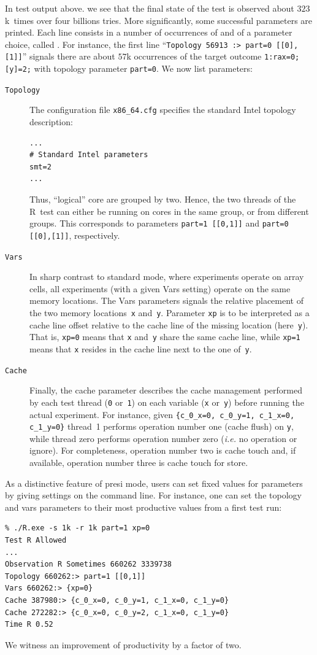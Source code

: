 In test output above. we see that the final state of the test is
observed about $323$k~times over four billions tries. More
significantly, some successful parameters are printed. Each line
consists in a number of occurrences of and of a parameter choice,
called . For instance,
the first line ``\texttt{Topology 56913 :> part=0 [[0],[1]]}'' signals
there are about $57$k occurrences of the target
outcome \texttt{1:rax=0; [y]=2;} with topology
parameter \texttt{part=0}. We now list parameters:
\begin{description}
\item[{\tt Topology}]  The configuration file \texttt{x86\_64.cfg}
specifies the standard Intel topology description:
\begin{verbatim}
...
# Standard Intel parameters
smt=2
...
\end{verbatim}
Thus, ``logical'' core are grouped by two. Hence, the two threads of
the R~test can either be running on cores in the same group, or from
different groups. This corresponds to parameters \texttt{part=1
[[0,1]]} and \texttt{part=0 [[0],[1]]}, respectively.
\item[{\tt Vars}] In sharp contrast to standard mode, where
experiments operate on array cells,  all experiments (with a given
Vars setting) operate on the same memory locations. The Vars
parameters signals the relative placement of the two memory
locations~\texttt{x} and~\texttt{y}. Parameter \texttt{xp} is to be
interpreted as a cache line offset relative to the cache line of the
missing location (here~\texttt{y}). That is, \texttt{xp=0} means
that \texttt{x} and~\texttt{y} share the same cache line,
while \texttt{xp=1} means that \texttt{x} resides in the cache line
next to the one of~\texttt{y}.
\item[{\tt Cache}] Finally, the cache  parameter describes the cache
management performed by each test thread (\texttt{0} or~\texttt{1}) on
each variable (\texttt{x} or~\texttt{y}) before running the actual
experiment. For instance, given \texttt{\{c\_0\_x=0, c\_0\_y=1,
c\_1\_x=0, c\_1\_y=0\}} thread~1 performs operation number one (cache
flush) on \texttt{y}, while thread zero performs operation number zero
(\emph{i.e.} no operation or ignore). For completeness, operation
number two is cache touch and, if available, operation number three is
cache touch for store.
\end{description}

As a distinctive feature of presi mode, users can set fixed values for
parameters by giving settings on the command line. For instance, one
can set the topology and vars parameters to their most productive
values from a first test run:
\begin{verbatim}
% ./R.exe -s 1k -r 1k part=1 xp=0
Test R Allowed
...
Observation R Sometimes 660262 3339738
Topology 660262:> part=1 [[0,1]]
Vars 660262:> {xp=0}
Cache 387980:> {c_0_x=0, c_0_y=1, c_1_x=0, c_1_y=0}
Cache 272282:> {c_0_x=0, c_0_y=2, c_1_x=0, c_1_y=0}
Time R 0.52
\end{verbatim}
We witness an improvement of productivity by a factor of two.

